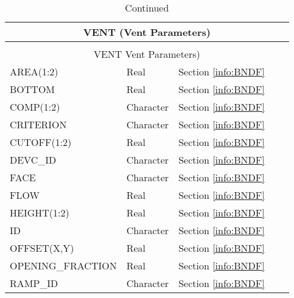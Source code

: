 \begin{longtable}{@{\extracolsep{\fill}}|l|l|l|l|l|}
\caption[Boundary file parameters ({\ct VENT} namelist group)]{For more information see Section~\ref{info:BNDF}.}
\label{tbl:VENT} \\
\hline
\multicolumn{5}{|c|}{{\ct VENT} (Vent Parameters)} \\
\hline \hline
\endfirsthead
\caption[]{Continued} \\
\hline
\multicolumn{5}{|c|}{{\ct VENT} Vent Parameters)} \\
\hline \hline
\endhead
{\ct AREA(1:2)}        & Real   & Section \ref{info:BNDF}                 &           &                 \\ \hline
{\ct BOTTOM}        & Real   & Section \ref{info:BNDF}                 &           &                 \\ \hline
{\ct COMP(1:2)}        & Character   & Section \ref{info:BNDF}                 &           &                 \\ \hline
{\ct CRITERION}        & Character   & Section \ref{info:BNDF}                 &           &                 \\ \hline
{\ct CUTOFF(1:2)}        & Real   & Section \ref{info:BNDF}                 &           &                 \\ \hline
{\ct DEVC\_ID}        & Character   & Section \ref{info:BNDF}                 &           &                 \\ \hline
{\ct FACE}        & Character   & Section \ref{info:BNDF}                 &           &                 \\ \hline
{\ct FLOW}        & Real   & Section \ref{info:BNDF}                 &           &                 \\ \hline
{\ct HEIGHT(1:2)}        & Real   & Section \ref{info:BNDF}                 &           &                 \\ \hline
{\ct ID}        & Character   & Section \ref{info:BNDF}                 &           &                 \\ \hline
{\ct OFFSET(X,Y)}        & Real   & Section \ref{info:BNDF}                 &           &                 \\ \hline
{\ct OPENING\_FRACTION}        & Real   & Section \ref{info:BNDF}                 &           &                 \\ \hline
{\ct RAMP\_ID}        & Character   & Section \ref{info:BNDF}                 &           &                 \\ \hline

\end{longtable}
